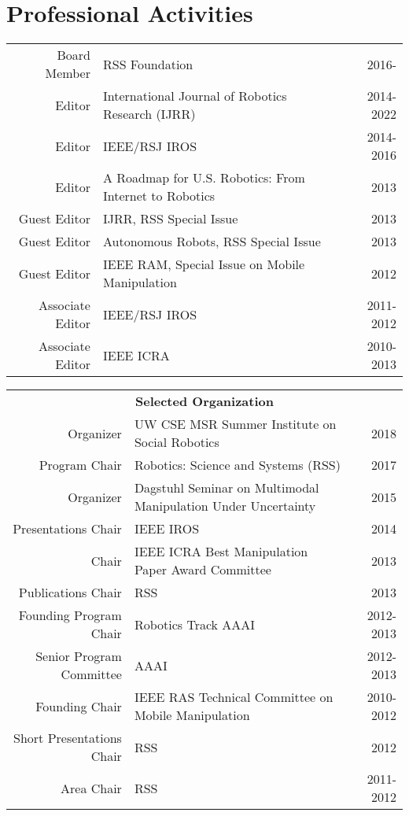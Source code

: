 
\section{Professional Activities}
\begin{tabularx}{\linewidth}{rXr}
Board Member & RSS Foundation & 2016-\\
Editor & International Journal of Robotics Research (IJRR) & 2014-2022\\
Editor & IEEE/RSJ IROS &  2014-2016\\
Editor & A Roadmap for U.S. Robotics: From Internet to Robotics & 2013\\
Guest Editor & IJRR, RSS Special Issue & 2013\\ 
Guest Editor & Autonomous Robots, RSS Special Issue & 2013\\ 
Guest Editor & IEEE RAM, Special Issue on Mobile Manipulation & 2012\\
Associate Editor & IEEE/RSJ IROS & 2011-2012\\
Associate Editor & IEEE ICRA & 2010-2013\\
\end{tabularx}

\begin{tabularx}{\linewidth}{rXr}
\multicolumn{3}{c}{\textbf{Selected Organization}}\\
Organizer & UW CSE MSR Summer Institute on Social Robotics & 2018\\
Program Chair & Robotics: Science and Systems (RSS) & 2017\\
Organizer & Dagstuhl Seminar on Multimodal Manipulation Under Uncertainty & 2015 \\
Presentations Chair & IEEE IROS & 2014\\ 
Chair & IEEE ICRA Best Manipulation Paper Award Committee & 2013\\
Publications Chair & RSS & 2013\\
Founding Program Chair & Robotics Track AAAI & 2012-2013 \\
Senior Program Committee & AAAI & 2012-2013 \\
Founding Chair & IEEE RAS Technical Committee on Mobile 
Manipulation & 2010-2012\\
Short Presentations Chair & RSS & 2012\\
Area Chair & RSS & 2011-2012\\
\end{tabularx}

